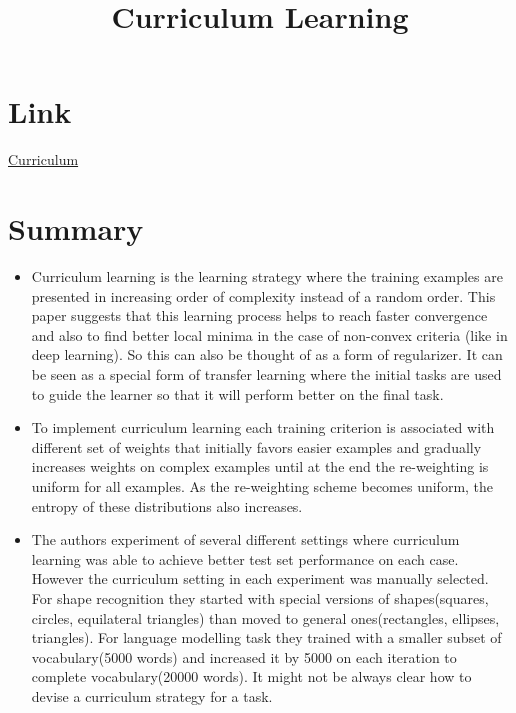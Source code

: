 \documentclass{article}
\title{Curriculum Learning}
\author{}
\date{}
\begin{document}
\maketitle

\section*{Link}
\href{https://ronan.collobert.com/pub/matos/2009_curriculum_icml.pdf}{Curriculum} 

\section*{Summary}
\begin{itemize}
    \item Curriculum learning is the learning strategy where the training examples are presented in increasing order of complexity instead of a random order. This paper suggests that this learning process helps to reach faster convergence and also to find better local minima in the case of non-convex criteria (like in deep learning). So this can also be thought of as a form of regularizer. It can be seen as a special form of transfer learning where the initial tasks are used to guide the learner so that it will perform better on the final task.
    \item To implement curriculum learning each training criterion is associated with different set of weights that initially favors easier examples and gradually increases weights on complex examples until at the end the re-weighting is uniform for all examples. As the re-weighting scheme becomes uniform, the entropy of these distributions also increases. 
    \item The authors experiment of several different settings where curriculum learning was able to achieve better test set performance on each case. However the curriculum setting in each experiment was manually selected. For shape recognition they started with special versions of shapes(squares, circles, equilateral triangles) than moved to general ones(rectangles, ellipses, triangles). For language modelling task they trained with a smaller subset of vocabulary(5000 words) and increased it by 5000 on each iteration to complete vocabulary(20000 words). It might not be always clear how to devise a curriculum strategy for a task.
    
\end{itemize}
\end{document}
